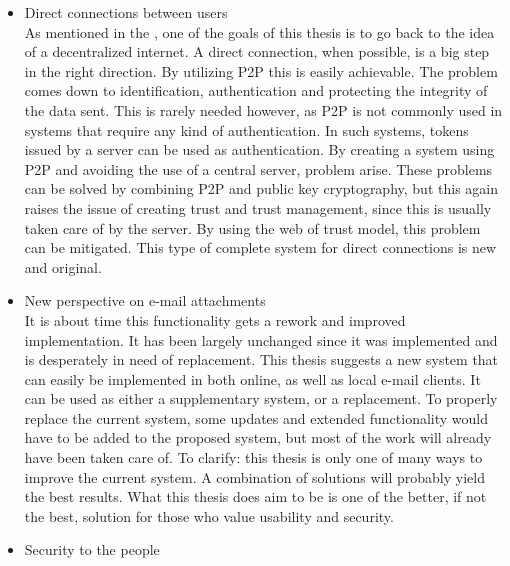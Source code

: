 \begin{itemize}
	\item Direct connections between users\\
	As mentioned in the , one of the goals of this thesis is to go back to the idea of a decentralized internet. A direct connection, when possible, is a big step in the right direction. By utilizing P2P this is easily achievable. The problem comes down to identification, authentication and protecting the integrity of the data sent. This is rarely needed however, as P2P is not commonly used in systems that require any kind of authentication. In such systems, tokens issued by a server can be used as authentication. By creating a system using P2P and avoiding the use of a central server, problem arise. These problems can be solved by combining P2P and public key cryptography, but this again raises the issue of creating trust and trust management, since this is usually taken care of by the server. By using the web of trust model, this problem can be mitigated. This type of complete system for direct connections is new and original.
	\item New perspective on e-mail attachments\\
	It is about time this functionality gets a rework and improved implementation. It has been largely unchanged since it was implemented and is desperately in need of replacement. This thesis suggests a new system that can easily be implemented in both online, as well as local e-mail clients. It can be used as either a supplementary system, or a replacement. To properly replace the current system, some updates and extended functionality would have to be added to the proposed system, but most of the work will already have been taken care of. To clarify: this thesis is only one of many ways to improve the current system. A combination of solutions will probably yield the best results. What this thesis does aim to be is one of the better, if not the best, solution for those who value usability and security.
	\item Security to the people\\

\end{itemize}
